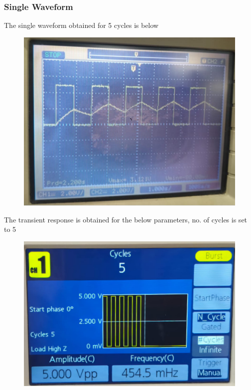 \documentclass[journal]{IEEEtran}
\begin{document}
\subsubsection{Single Waveform}
The single waveform obtained for 5 cycles is below 
\begin{figure}[H]
    \centering
    \includegraphics[width=0.8\linewidth]{figs/Rc=t2.jpeg}
\end{figure}
The transient response is obtained for the below parameters, no. of cycles is set to 5 
\begin{figure}[H]
    \centering
    \includegraphics[width=0.5\linewidth]{figs/ip1.jpeg}
\end{figure}
\end{document}
